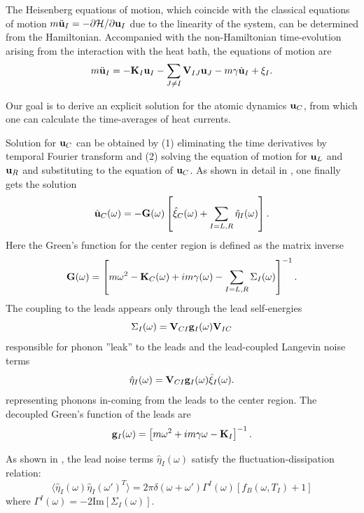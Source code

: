 The Heisenberg equations of motion, which coincide with the classical equations of motion $m\ddot{\mathbf{u}}_I=-\partial \mathcal{H}/\partial \mathbf{u}_I$ due to the linearity of the system, can be determined from the Hamiltonian. Accompanied with the non-Hamiltonian time-evolution arising from the interaction with the heat bath, the equations of motion are
\begin{equation}
  m\ddot{\mathbf{u}}_I = - \mathbf{K}_I \mathbf{u}_I - \sum_{J\neq I} \mathbf{V}_{IJ} \mathbf{u}_J - m \gamma \dot{\mathbf{u}}_I + \xi_I. \label{eq:gfm_eom_I}
\end{equation}

Our goal is to derive an explicit solution for the atomic dynamics $\mathbf{u}_C$, from which one can calculate the time-averages of heat currents.

Solution for $\mathbf{u}_C$ can be obtained by (1) eliminating the time derivatives by temporal Fourier transform and (2) solving the equation of motion for $\mathbf{u}_L$ and $\mathbf{u}_R$ and substituting to the equation of $\mathbf{u}_C$. As shown in detail in , one finally gets the solution
\begin{equation}
 \hat{\mathbf{u}}_C(\omega) = - \mathbf{G}(\omega) \left[ \hat\xi_C(\omega) + \sum_{I=L,R} \hat{\eta}_I(\omega) \right]. \label{eq:gfm_uc_sol}
\end{equation}
Here the Green's function for the center region is defined as the matrix inverse
\begin{equation}
 \mathbf{G}(\omega) = \left[m\omega^2 - \mathbf{K}_C(\omega) +im\gamma(\omega) - \sum_{I=L,R} \Sigma_I(\omega)  \right]^{-1}.
\end{equation}
The coupling to the leads appears only through the lead self-energies
\begin{equation}
 \Sigma_I(\omega) = \mathbf{V}_{CI} \mathbf{g}_I(\omega) \mathbf{V}_{IC} 
\end{equation}
responsible for phonon ''leak'' to the leads and the lead-coupled Langevin noise terms
\begin{equation}
 \hat\eta_I(\omega) = \mathbf{V}_{CI}\mathbf{g}_I(\omega) \hat{\xi}_I(\omega).
\end{equation}
representing phonons in-coming from the leads to the center region. The decoupled Green's function of the leads are
\begin{equation}
 \mathbf{g}_I(\omega) = \left[m\omega^2+im\gamma\omega - \mathbf{K}_I \right]^{-1}.
\end{equation}

As shown in , the lead noise terms $\hat\eta_I(\omega)$ satisfy the fluctuation-dissipation relation:
\begin{equation}
 \langle \hat\eta_I(\omega) \hat\eta_I(\omega')^T \rangle=2\pi\delta(\omega+\omega') \Gamma^I(\omega) \left[f_B(\omega,T_I)+1 \right]
\end{equation}
where $\Gamma^I(\omega)=-2\textrm{Im}[\Sigma_I(\omega)]$.

